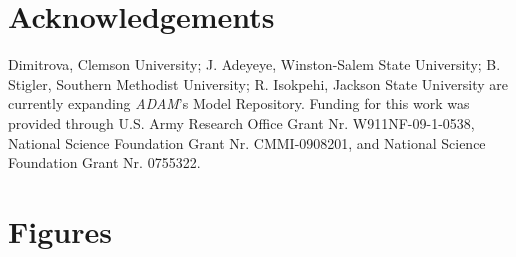 \documentclass[10pt]{bmc_article}
\newenvironment{bmcformat}{\fussy\setboolean{publ}{true}}{\fussy}
\begin{document}
\begin{bmcformat}
\section*{Acknowledgements}
 Dimitrova, Clemson University; J. Adeyeye, Winston-Salem State University; B. Stigler, Southern Methodist University; R. Isokpehi, Jackson State University are currently expanding {\it ADAM}’s Model Repository.
Funding for this work was provided through U.S. Army Research Office Grant Nr. W911NF-09-1-0538,
National Science Foundation Grant Nr. CMMI-0908201, and National Science Foundation Grant Nr. 0755322.


 


{
   }     %





\section*{Figures}

\end{bmcformat}
\end{document}
